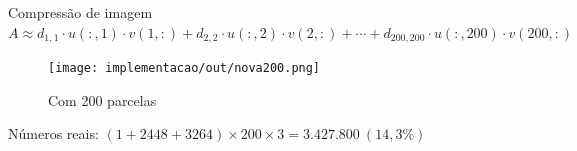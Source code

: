 \documentclass{beamer}
\begin{document}
\begin{frame}{Compress\~ao de imagem}{
    $A \approx d_{1,1}\cdot u(:,1)\cdot v(1,:) + d_{2,2}\cdot
    u(:,2)\cdot v(2,:) +\cdots+ d_{200,200}\cdot u(:,200)\cdot v(200,:)$}
    \pause
    \begin{figure}
        \centering
        \texttt{[image: implementacao/out/nova200.png]}
        \caption{Com 200 parcelas}
    \end{figure}
    \begin{center}
        N\'umeros reais: $(1 + 2448 + 3264)\times 200 \times 3 = 3.427.800\ (14,3\%)$
    \end{center}
\end{frame}

%

%
\end{document}
